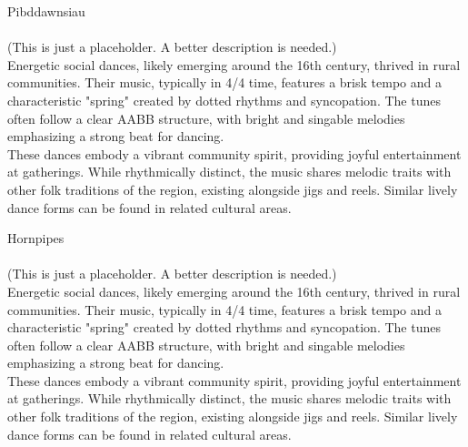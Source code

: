 \begin{multicols}{2}
    \Huge{Pibddawnsiau}\\
    \vspace{1cm}\\
    \normalsize{
      \noindent 
      (This is just a placeholder. A better description is needed.)\\

      Energetic social dances, likely emerging around the 16th century, 
      thrived in rural communities. Their music, typically in 4/4 time, 
      features a brisk tempo and a characteristic "spring" created by 
      dotted rhythms and syncopation. The tunes often follow a clear AABB structure, 
      with bright and singable melodies emphasizing a strong beat for dancing.\\

      These dances embody a vibrant community spirit, providing joyful entertainment 
      at gatherings. While rhythmically distinct, the music shares melodic traits 
      with other folk traditions of the region, existing alongside jigs and reels. 
      Similar lively dance forms can be found in related cultural areas.
    }

    \newcolumn

    \Huge{Hornpipes}\\
    \vspace{1cm}\\
    \normalsize{
      \noindent
      (This is just a placeholder. A better description is needed.)\\

      Energetic social dances, likely emerging around the 16th century, 
      thrived in rural communities. Their music, typically in 4/4 time, 
      features a brisk tempo and a characteristic "spring" created by 
      dotted rhythms and syncopation. The tunes often follow a clear AABB structure, 
      with bright and singable melodies emphasizing a strong beat for dancing.\\

      These dances embody a vibrant community spirit, providing joyful entertainment 
      at gatherings. While rhythmically distinct, the music shares melodic traits 
      with other folk traditions of the region, existing alongside jigs and reels. 
      Similar lively dance forms can be found in related cultural areas.
    }

    \end{multicols}
